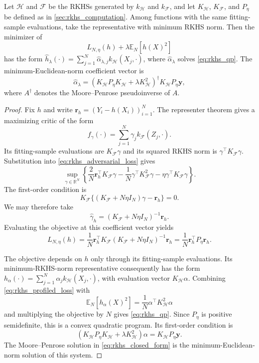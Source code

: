 \begin{proposition}
\label{prop:rkhs_qp}
Let $\mathcal H$ and $\mathcal F$ be the RKHSs generated by $k_{\mathcal H}$ and $k_{\mathcal F}$, and let $K_{\mathcal H}$, $K_{\mathcal F}$, and $P_\eta$ be defined as in \cref{sec:rkhs_computation}. Among functions with the same fitting-sample evaluations, take the representative with minimum RKHS norm. Then the minimizer of
\[
L_{N,\eta}(h)+\lambda\mathbb E_N[h(X)^2]
\]
has the form $\widehat h_\lambda(\cdot)=\sum_{j=1}^N\widehat\alpha_{\lambda,j}k_{\mathcal H}(X_j,\cdot)$, where $\widehat\alpha_\lambda$ solves \eqref{eq:rkhs_qp}. The minimum-Euclidean-norm coefficient vector is
\begin{equation}
\label{eq:rkhs_closed_form}
\widehat\alpha_\lambda
=\left(K_{\mathcal H}P_\eta K_{\mathcal H}
+\lambda K_{\mathcal H}^2\right)^\dagger
K_{\mathcal H}P_\eta\boldsymbol y,
\end{equation}
where $A^\dagger$ denotes the Moore--Penrose pseudoinverse of $A$.
\end{proposition}

\begin{proof}
Fix $h$ and write $\boldsymbol r_h=(Y_i-h(X_i))_{i=1}^N$. The representer theorem gives a maximizing critic of the form
\[
f_\gamma(\cdot)=\sum_{j=1}^N\gamma_j k_{\mathcal F}(Z_j,\cdot).
\]
Its fitting-sample evaluations are $K_{\mathcal F}\gamma$ and its squared RKHS norm is $\gamma^\top K_{\mathcal F}\gamma$. Substitution into \eqref{eq:rkhs_adversarial_loss} gives
\[
\sup_{\gamma\in\mathbb R^N}
\left\{
\frac{2}{N}\boldsymbol r_h^\top K_{\mathcal F}\gamma
-\frac{1}{N}\gamma^\top K_{\mathcal F}^2\gamma
-\eta\gamma^\top K_{\mathcal F}\gamma
\right\}.
\]
The first-order condition is
\[
K_{\mathcal F}
\{(K_{\mathcal F}+N\eta I_N)\gamma-\boldsymbol r_h\}=0.
\]
We may therefore take
\[
\widehat\gamma_h=(K_{\mathcal F}+N\eta I_N)^{-1}\boldsymbol r_h.
\]
Evaluating the objective at this coefficient vector yields
\begin{equation}
\label{eq:rkhs_profiled_loss}
L_{N,\eta}(h)
=\frac{1}{N}\boldsymbol r_h^\top
K_{\mathcal F}(K_{\mathcal F}+N\eta I_N)^{-1}
\boldsymbol r_h
=\frac{1}{N}\boldsymbol r_h^\top P_\eta\boldsymbol r_h.
\end{equation}

The objective depends on $h$ only through its fitting-sample evaluations. Its minimum-RKHS-norm representative consequently has the form $h_\alpha(\cdot)=\sum_{j=1}^N\alpha_j k_{\mathcal H}(X_j,\cdot)$, with evaluation vector $K_{\mathcal H}\alpha$. Combining \eqref{eq:rkhs_profiled_loss} with
\[
\mathbb E_N[h_\alpha(X)^2]
=\frac{1}{N}\alpha^\top K_{\mathcal H}^2\alpha
\]
and multiplying the objective by $N$ gives \eqref{eq:rkhs_qp}. Since $P_\eta$ is positive semidefinite, this is a convex quadratic program. Its first-order condition is
\[
\left(K_{\mathcal H}P_\eta K_{\mathcal H}
+\lambda K_{\mathcal H}^2\right)\alpha
=K_{\mathcal H}P_\eta\boldsymbol y.
\]
The Moore--Penrose solution in \eqref{eq:rkhs_closed_form} is the minimum-Euclidean-norm solution of this system.
\end{proof}

